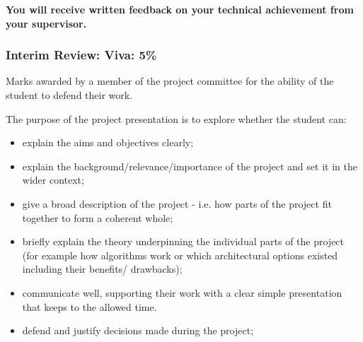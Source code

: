 \documentclass[11pt]{article}
\newcommand{\vivaweight}{5\% }
\begin{document}

\textbf{You will receive written feedback on your technical achievement from your supervisor.}

\newpage
\subsubsection{Interim Review: Viva: \vivaweight}
Marks awarded by a member of the project committee for the ability of the student to defend their work.

The purpose of the project presentation is to explore whether the student can:
\begin{itemize}
\item explain the aims and objectives clearly;
\item explain the background/relevance/importance of the project and set it in the wider context;
\item give a broad description of the project - i.e. how parts of the project fit together to form a coherent whole;
\item briefly explain the theory underpinning the individual parts of the project (for example how algorithms work or
which architectural options existed including their benefits/ drawbacks);
\item communicate well, supporting their work with a clear simple presentation that keeps to the allowed time.
\item defend and justify decisions made during the project;
\end{itemize}


\vspace*{10mm}
\end{document}
